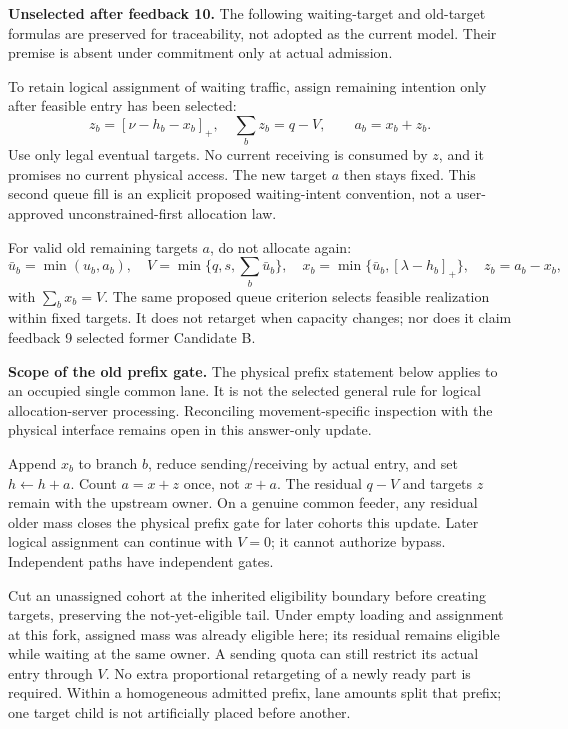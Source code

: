 \documentclass[10pt,a4paper]{article}
\newcommand{\pos}[1]{[#1]_+}
\begin{document}
\textbf{Unselected after feedback 10.}
The following waiting-target and old-target formulas are preserved for
traceability, not adopted as the current model. Their premise is absent
under commitment only at actual admission.

To retain logical assignment of waiting traffic, assign remaining intention
only after feasible entry has been selected:
\begin{equation}
 z_b=\pos{\nu-h_b-x_b},\quad \sum_bz_b=q-V,\qquad a_b=x_b+z_b.
 \label{eq:pending-allocation}
\end{equation}
Use only legal eventual targets. No current receiving is consumed by $z$,
and it promises no current physical access. The new target $a$ then stays
fixed. This second queue fill is an explicit proposed waiting-intent
convention, not a user-approved unconstrained-first allocation law.

For valid old remaining targets $a$, do not allocate again:
\begin{equation}
 \bar u_b=\min(u_b,a_b),\quad V=\min\{q,s,\sum_b\bar u_b\},\quad
 x_b=\min\{\bar u_b,\pos{\lambda-h_b}\},\quad z_b=a_b-x_b,
 \label{eq:old-commitment}
\end{equation}
with $\sum_bx_b=V$. The same proposed queue criterion selects feasible
realization within fixed targets. It does not retarget when capacity changes;
nor does it claim feedback 9 selected former Candidate B.

\textbf{Scope of the old prefix gate.}
The physical prefix statement below applies to an occupied single common
lane. It is not the selected general rule for logical allocation-server
processing. Reconciling movement-specific inspection with the physical
interface remains open in this answer-only update.

Append $x_b$ to branch $b$, reduce sending/receiving by actual entry, and
set $h\leftarrow h+a$. Count $a=x+z$ once, not $x+a$. The residual $q-V$
and targets $z$ remain with the upstream owner. On a genuine common feeder,
any residual older mass closes the physical prefix gate for later cohorts
this update. Later logical assignment can continue with $V=0$; it cannot
authorize bypass. Independent paths have independent gates.

Cut an unassigned cohort at the inherited eligibility boundary before
creating targets, preserving the not-yet-eligible tail. Under empty loading
and assignment at this fork, assigned mass was already eligible here;
its residual remains eligible while waiting at the same owner. A sending
quota can still restrict its actual entry through $V$. No extra
proportional retargeting of a newly ready part is required. Within a
homogeneous admitted prefix, lane amounts split that prefix; one target
child is not artificially placed before another.
\end{document}
